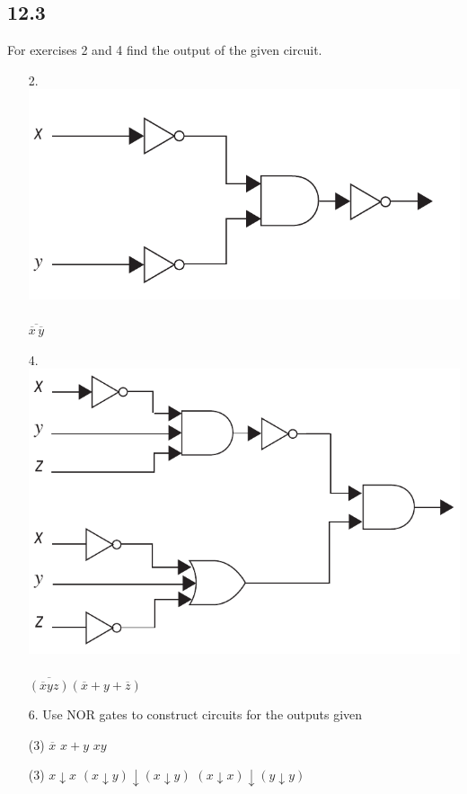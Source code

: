 \subsection{12.3}
For exercises 2 and 4 find the output of the given circuit.
\begin{itemize}
    \item[2.] \text{} \\
          \includegraphics[scale = 0.6]{img/12_3_2_circuit.png} \\
          \answer \vspace{1mm}\\
          $\overline{\overline{x}\,\overline{y}}$

    \item[4.] \text{} \\
          \includegraphics[scale = 0.6]{img/12_3_4_circuit.png} \\
          \answer \vspace{1mm}\\
          $\overline{(\overline{x}yz)}(\overline{x} + y + \overline{z})$

    \item[6.]  Use NOR gates to construct circuits for the outputs given
    \begin{tasks}(3)
          \task $\overline{x}$
          \task $x + y$
          \task $xy$
    \end{tasks}
    \answer
    \begin{tasks}(3)
        \task $x \downarrow x$
        \task $(x \downarrow y) \downarrow (x \downarrow y)$
        \task $(x \downarrow x) \downarrow (y \downarrow y)$
    \end{tasks}

\end{itemize}